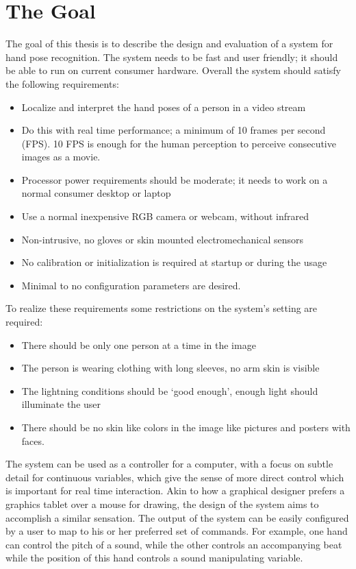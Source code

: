 \section{The Goal}
\label{sec:goal}
The goal of this thesis is to describe the design and evaluation of a system for hand pose recognition. The system needs to be fast and user friendly; it should be able to run on current consumer hardware. Overall the system should satisfy the following requirements:

\begin{itemize}
	\item Localize and interpret the hand poses of a person in a video stream
	\item Do this with real time performance; a minimum of 10 frames per second (FPS). 10 FPS is enough for the human perception to perceive consecutive images as a movie. 
	\item Processor power requirements should be moderate; it needs to work on a normal consumer desktop or laptop
	\item Use a normal inexpensive RGB camera or webcam, without infrared
	\item Non-intrusive, no gloves or skin mounted electromechanical sensors
	\item No calibration or initialization is required at startup or during the usage
	\item Minimal to no configuration parameters are desired.
\end{itemize}
	
To realize these requirements some restrictions on the system's setting are required:

\begin{itemize}
	\item There should be only one person at a time in the image
	\item The person is wearing clothing with long sleeves, no arm skin is visible
	\item The lightning conditions should be `good enough', enough light should illuminate the user
	\item There should be no skin like colors in the image like pictures and posters with faces.
\end{itemize}

The system can be used as a controller for a computer, with a focus on subtle detail for continuous variables, which give the sense of more direct control which is important for real time interaction. Akin to how a graphical designer prefers a graphics tablet over a mouse for drawing, the design of the system aims to accomplish a similar sensation. The output of the system can be easily configured by a user to map to his or her preferred set of commands. For example, one hand can control the pitch of a sound, while the other controls an accompanying beat while the position of this hand controls a sound manipulating variable.


